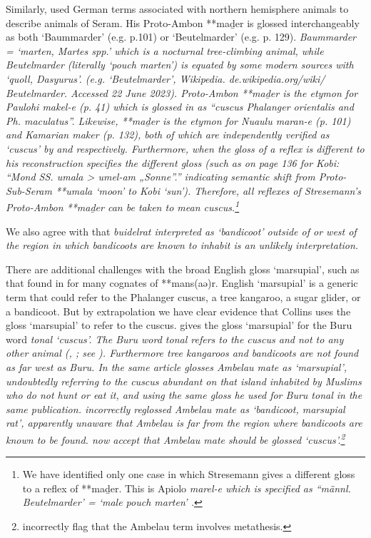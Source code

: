 Similarly, \citet{Stresemann1927} used German terms associated with northern
hemisphere animals to describe animals of Seram.
His Proto-Ambon **maḏer is glossed interchangeably as both ‘Baummarder’ (e.g.
p.101) or ‘Beutelmarder’ (e.g. p. 129).
\it{Baummarder} = ‘marten, \it{Martes spp.}’ which is a nocturnal
tree-climbing animal, while \it{Beutelmarder} (literally ‘pouch marten’) is equated
by some modern sources with ‘quoll, \it{Dasyurus}’.
(e.g. ‘Beutelmarder’, Wikipedia. de.wikipedia.org/wiki/ Beutelmarder.
Accessed 22 June 2023).
Proto-Ambon **maḏer is the etymon for Paulohi \it{makel-e} (p. 41)
which is glossed in \citet[130]{Stresemann1918} as
``cuscus \it{Phalanger orientalis} and \it{Ph. maculatus}''.
Likewise, **maḏer is the etymon for
Nuaulu \it{maran-e} (p. 101) and Kamarian \it{maker} (p.
132), both of which are independently verified as ‘cuscus’ by
\citet[196f]{Ellen1972,Ellen1993} and \citet[304f]{vanEkris1864} respectively.
Furthermore, when the gloss of a reflex is different to his reconstruction
\citet{Stresemann1927} specifies the different gloss (such as on page 136
for Kobi: “Mond SS. \it{umala} > \it{umel-am} „Sonne”.” indicating semantic shift
from Proto-Sub-Seram **umala ‘moon’ to Kobi ‘sun’).
Therefore, all reflexes of Stresemann’s Proto-Ambon **maḏer can
be taken to mean cuscus.\footnote{
		We have identified only one case in which Stresemann gives a different
		gloss to a reflex of **maḏer. This is Apiolo \it{marel-e} which is
		specified as ``männl. Beutelmarder' = `male pouch marten' \citep[180]{Stresemann1927}.}

We also agree with \citet{Schapper2011} that \it{buidelrat} interpreted
as ‘bandicoot’ outside of or west of the region in which bandicoots
are known to inhabit is an unlikely interpretation.

There are additional challenges with the broad English gloss
‘marsupial’, such as that found in \citet{Collins1983} for many cognates of **mans(aə)r.
English ‘marsupial’ is a generic term that could refer to the
Phalanger cuscus, a tree kangaroo, a sugar glider, or a bandicoot.
But by extrapolation we have clear evidence that Collins uses
the gloss ‘marsupial’ to refer to the cuscus.
\citet[42]{Collins1981} gives the gloss ‘marsupial’ for the Buru word \it{tonal} ‘cuscus’.
The Buru word \it{tonal} refers to the cuscus
and not to any other animal (\cite[19]{Grimes1991c}, \cite[942]{GrimesGrimes2020}; see ).
Furthermore tree kangaroos and bandicoots are not found as far west as Buru.
In the same article \citet[36]{Collins1981} glosses Ambelau \it{mate}
as ‘marsupial’, undoubtedly referring to the cuscus abundant on that island inhabited
by Muslims who do not hunt or eat it,
and using the same gloss he used for Buru \it{tonal} in the same publication.
\citet[241]{Blust1982} incorrectly reglossed Ambelau \it{mate}
as ‘bandicoot, marsupial rat’, apparently unaware that Ambelau is far from the
region where bandicoots are known to be found.
\citet{BlustTrussel2020} now accept that Ambelau \it{mate} should
be glossed ‘cuscus’.\footnote{
		\citet{BlustTrussel2020} incorrectly
		flag that the Ambelau term involves metathesis.}

